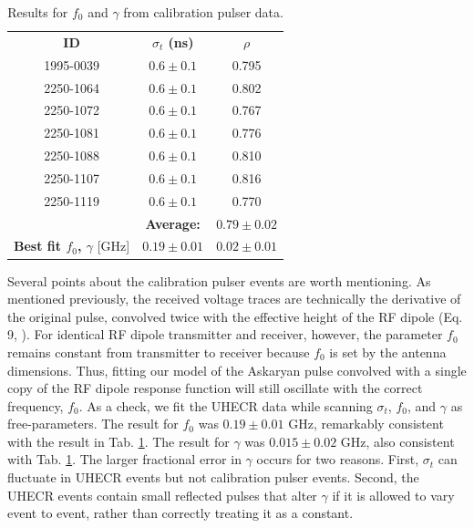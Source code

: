 \documentclass[amsmath,amssymb,aps,prd,10pt,twocolumn,showkeys]{revtex4}
\begin{document}
\begin{table}
\centering
\begin{tabular}{| c | c | c |}
\hline
\textbf{ID} & \textbf{$\sigma_t$ (ns)} & $\rho$ \\ 
1995-0039 & $0.6\pm 0.1$ & 0.795 \\
2250-1064 & $0.6\pm 0.1$ & 0.802 \\
2250-1072 & $0.6\pm 0.1$ & 0.767 \\
2250-1081 & $0.6\pm 0.1$ & 0.776 \\
2250-1088 & $0.6\pm 0.1$ & 0.810 \\
2250-1107 & $0.6\pm 0.1$ & 0.816 \\
2250-1119 & $0.6\pm 0.1$ & 0.770 \\ \hline
& \textbf{Average:} & $0.79\pm 0.02$ \\ \hline \hline
\textbf{Best fit $f_0$, $\gamma$} [GHz] & $0.19\pm 0.01$ & $0.02\pm 0.01$ \\
\hline
\end{tabular}
\caption{\label{tab:cal} Results for $f_0$ and $\gamma$ from calibration pulser data.}
\end{table}

Several points about the calibration pulser events are worth mentioning.  As mentioned previously, the received voltage traces are technically the derivative of the original pulse, convolved twice with the effective height of the RF dipole (Eq. 9, \cite{barwick2015timedomain-461}).  For identical RF dipole transmitter and receiver, however, the parameter $f_0$ remains constant from transmitter to receiver because $f_0$ is set by the antenna dimensions.  Thus, fitting our model of the Askaryan pulse convolved with a single copy of the RF dipole response function will still oscillate with the correct frequency, $f_0$.  As a check, we fit the UHECR data while scanning $\sigma_t$, $f_0$, and $\gamma$ as free-parameters.  The result for $f_0$ was $0.19\pm 0.01$ GHz, remarkably consistent with the result in Tab. \ref{tab:cal}.  The result for $\gamma$ was $0.015\pm 0.02$ GHz, also consistent with Tab. \ref{tab:cal}.  The larger fractional error in $\gamma$ occurs for two reasons.  First, $\sigma_t$ can fluctuate in UHECR events but not calibration pulser events.  Second, the UHECR events contain small reflected pulses that alter $\gamma$ if it is allowed to vary event to event, rather than correctly treating it as a constant.
\end{document}
